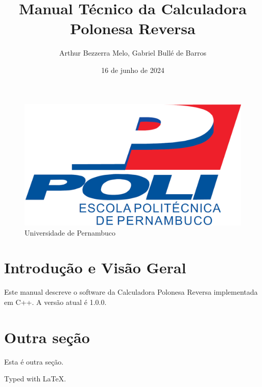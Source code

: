 \documentclass[twocolumn,a4paper,12pt]{article}
\title{Manual Técnico da Calculadora Polonesa Reversa}
\author{Arthur Bezzerra Melo, Gabriel Bullé de Barros}
\date{16 de junho de 2024}
\begin{document}
\maketitle

\begin{figure}[h]
    \centering
    \includegraphics[width=0.5\linewidth]{logo-poli.png}
    \caption{Universidade de Pernambuco}
    \label{fig:logo-poli.png}
\end{figure}

\section{Introdução e Visão Geral}

Este manual descreve o software da Calculadora Polonesa Reversa implementada em C++. A versão atual é 1.0.0.

\section{Outra seção}

Esta é outra seção.

%



\vfill

Typed with \LaTeX.
\end{document}
